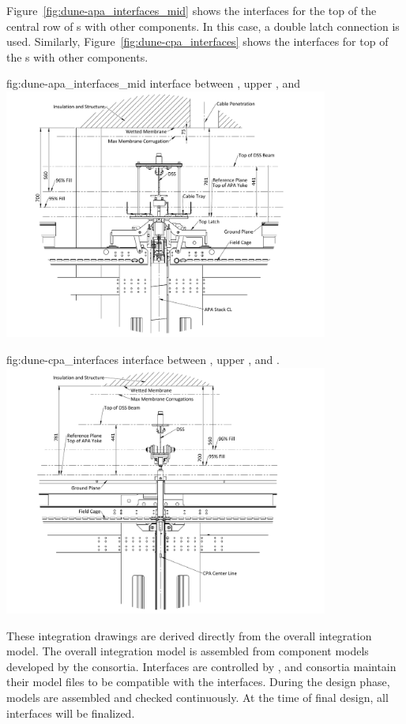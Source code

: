 Figure~\ref{fig:dune-apa_interfaces_mid} shows the interfaces for the
top of the central row of s with other components. In this case, a
double latch connection is used. Similarly,
Figure~\ref{fig:dune-cpa_interfaces} shows the interfaces for top of the
s with other components.
\begin{dunefigure}{fig:dune-apa_interfaces_mid}
  { interface between , upper , and }
  \includegraphics[width=0.8\textwidth]{graphics/Interface_upper_mid_apa.pdf}
\end{dunefigure}
\begin{dunefigure}
    {fig:dune-cpa_interfaces}
  { interface between , upper , and .}
  \includegraphics[width=0.8\textwidth]{graphics/Interface_upper_cpa.pdf}
\end{dunefigure}

These integration drawings are derived directly from the overall
integration model. The overall integration model is assembled from
component models developed by the consortia. Interfaces are controlled
by , and consortia maintain their model files to be
compatible with the interfaces. During the design phase, models are
assembled and checked continuously. At the time of final design, all
interfaces will be finalized.


